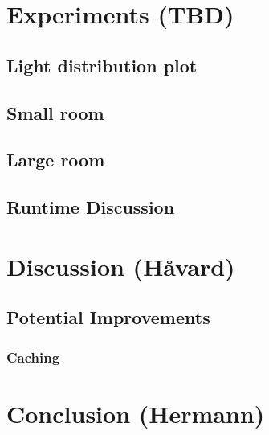 \documentclass{article}
\begin{document}
\newpage

\section{Experiments (TBD)}
\subsection{Light distribution plot}
\subsection{Small room}
\subsection{Large room}
\subsection{Runtime Discussion}



\newpage

\section{Discussion (Håvard)}

\subsection{Potential Improvements}
\subsubsection{Caching}

\newpage

\section{Conclusion (Hermann)}
\end{document}
